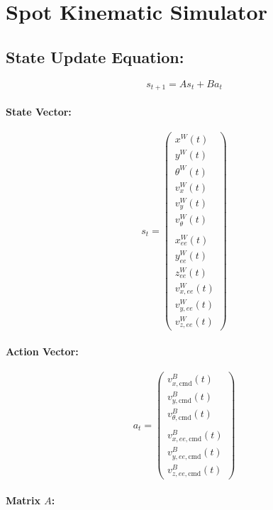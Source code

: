 \documentclass{article}
\begin{document}
\section*{Spot Kinematic Simulator}
\subsection*{State Update Equation:}

\[
s_{t+1} = A s_t + B a_t
\] 

\paragraph{State Vector:}

\[
s_t = \begin{pmatrix}
x^W(t) \\
y^W(t) \\
\theta^W(t) \\
v_x^W(t) \\
v_y^W(t) \\
v_\theta^W(t) \\
\\
x_{ee}^W(t) \\
y_{ee}^W(t) \\
z_{ee}^W(t) \\
v_{x,ee}^W(t) \\
v_{y,ee}^W(t) \\
v_{z,ee}^W(t)
\end{pmatrix}
\]

\paragraph{Action Vector:}

\[
a_t = \begin{pmatrix}
v_{x,\text{cmd}}^B(t) \\
v_{y,\text{cmd}}^B(t) \\
v_{\theta,\text{cmd}}^B(t) \\
\\
v_{x,ee,\text{cmd}}^B(t) \\
v_{y,ee,\text{cmd}}^B(t) \\
v_{z,ee,\text{cmd}}^B(t)
\end{pmatrix}
\]

\paragraph{Matrix \(A\):}
\end{document}
